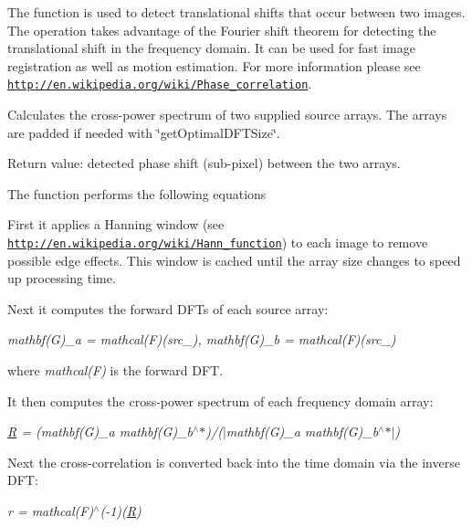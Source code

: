 The function is used to detect translational shifts that occur between two images. The operation takes advantage of the Fourier shift theorem for detecting the translational shift in the frequency domain. It can be used for fast image registration as well as motion estimation. For more information please see \href{http://en.wikipedia.org/wiki/Phase_correlation}{\tt http\+://en.\+wikipedia.\+org/wiki/\+Phase\+\_\+correlation}.

Calculates the cross-\/power spectrum of two supplied source arrays. The arrays are padded if needed with \char`\"{}get\+Optimal\+D\+F\+T\+Size\char`\"{}.

Return value\+: detected phase shift (sub-\/pixel) between the two arrays.

The function performs the following equations


\begin{DoxyItemize}
\item First it applies a Hanning window (see \href{http://en.wikipedia.org/wiki/Hann_function}{\tt http\+://en.\+wikipedia.\+org/wiki/\+Hann\+\_\+function}) to each image to remove possible edge effects. This window is cached until the array size changes to speed up processing time. 
\item Next it computes the forward D\+F\+Ts of each source array\+: 
\end{DoxyItemize}

{\itshape mathbf(\+G)\+\_\+a = mathcal(\+F)(src\+\_), mathbf(\+G)\+\_\+b = mathcal(\+F)(src\+\_)}

where {\itshape mathcal(\+F)} is the forward D\+FT.


\begin{DoxyItemize}
\item It then computes the cross-\/power spectrum of each frequency domain array\+: 
\end{DoxyItemize}

{\itshape \mbox{\hyperlink{classorg_1_1opencv_1_1_r}{R}} = (mathbf(\+G)\+\_\+a mathbf(\+G)\+\_\+b$^\wedge$$\ast$)/($\vert$mathbf(G)\+\_\+a mathbf(\+G)\+\_\+b$^\wedge$$\ast$$\vert$)}


\begin{DoxyItemize}
\item Next the cross-\/correlation is converted back into the time domain via the inverse D\+FT\+: 
\end{DoxyItemize}

{\itshape r = mathcal(\+F)$^\wedge$(-\/1)(\mbox{\hyperlink{classorg_1_1opencv_1_1_r}{R}})}


